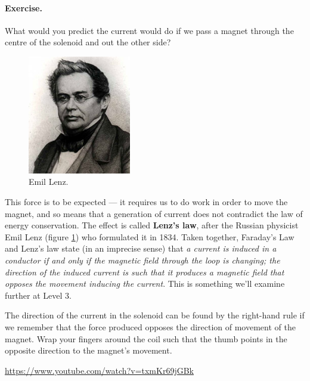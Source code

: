 \documentclass[a4paper]{amsbook}
\newcommand\capcite[1]{}
\begin{document}
\paragraph{Exercise.} What would you predict the current would do if we pass a magnet through the centre of the solenoid and out the other side?

\begin{figure}
  \centering
  \includegraphics[width=0.4\textwidth]{lenz}
  \caption{Emil Lenz. \capcite{https://upload.wikimedia.org/wikipedia/commons/e/ee/EKLenz.jpg}\label{fig:lenz}}
\end{figure}

This force is to be expected --- it requires us to do work in order to move the magnet, and so means that a generation of current does not contradict
the law of energy conservation. The effect is called \textbf{Lenz's law}, after the Russian physicist Emil Lenz (figure \ref{fig:lenz}) who formulated
it in 1834. Taken together, Faraday's Law and Lenz's law state (in an imprecise sense) that \textit{a current is induced in a conductor if and only
if the magnetic field through the loop is changing; the direction of the induced current is such that it produces a magnetic field that opposes
the movement inducing the current}. This is something we'll examine further at Level 3.

The direction of the current in the solenoid can be found by the right-hand rule if we remember that the force produced opposes the direction of
movement of the magnet. Wrap your fingers around the coil such that the thumb points in the opposite direction to the magnet's movement.

\begin{center}
\begin{tcolorbox}[width=0.8\textwidth,colback={red},title={\textbf{Go and watch...}},colbacktitle=yellow,coltitle=blue]
  \textcolor{white}{\url{https://www.youtube.com/watch?v=txmKr69jGBk}}
\end{tcolorbox}
\end{center}
\end{document}
